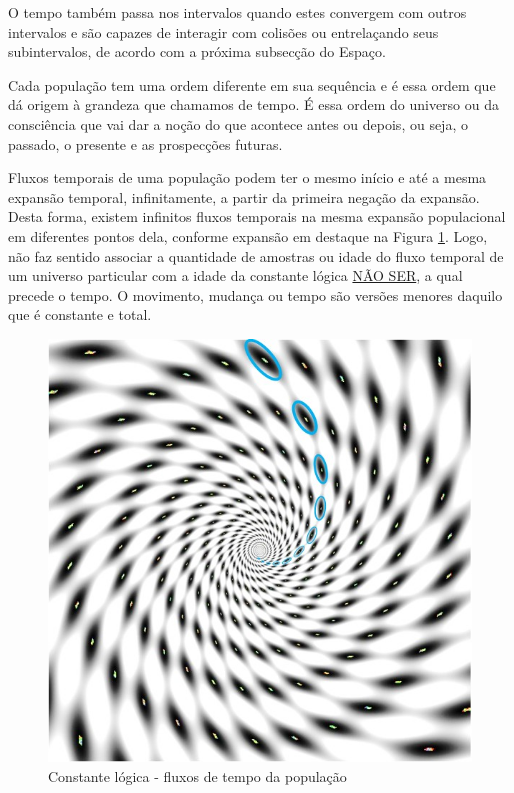O tempo também passa nos intervalos quando estes convergem com outros intervalos e são capazes de interagir com colisões ou entrelaçando seus subintervalos, de acordo com a próxima subsecção do Espaço.

Cada população tem uma ordem diferente em sua sequência e é essa ordem que dá origem à grandeza que chamamos de tempo. É essa ordem do universo ou da consciência que vai dar a noção do que acontece antes ou depois, ou seja, o passado, o presente e as prospecções futuras.

Fluxos temporais de uma população podem ter o mesmo início e até a mesma expansão temporal, infinitamente, a partir da primeira negação da expansão. Desta forma, existem infinitos fluxos temporais na mesma expansão populacional em diferentes pontos dela, conforme expansão em destaque na Figura \ref{fig:consciousness_constant_time}. Logo, não faz sentido associar a quantidade de amostras ou idade do fluxo temporal de um universo particular com a idade da constante lógica \underline{NÃO SER}, a qual precede o tempo. O movimento, mudança ou tempo são versões menores daquilo que é constante e total.
	\begin{figure}[H]
	\caption{Constante lógica - fluxos de tempo da população}
	\label{fig:consciousness_constant_time}
	\centering
	\includegraphics[scale=.6]{sections/images/consciousness_constant_time.jpg}
	\end{figure}

